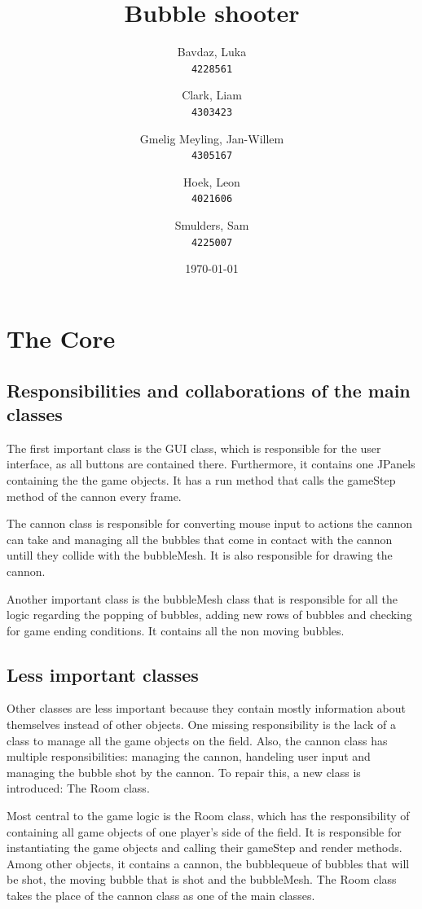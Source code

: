\documentclass[a4paper]{article}
\title{Bubble shooter}
\author{
    Bavdaz, Luka\\
    \texttt{4228561}
    \and
    Clark, Liam\\
    \texttt{4303423}
    \and
    Gmelig Meyling, Jan-Willem\\
    \texttt{4305167}
    \and
    Hoek, Leon\\
    \texttt{4021606}
    \and
    Smulders, Sam\\
    \texttt{4225007}
}
\date{\today}
\begin{document}
\maketitle


\section{The Core}
\subsection{Responsibilities and collaborations of the main classes}
The first important class is the GUI class, which is responsible for the user interface, as all buttons are contained there. Furthermore, it contains one JPanels containing the the game objects. It has a run method that calls the gameStep method of the cannon every frame.

The cannon class is responsible for converting mouse input to actions the cannon can take and managing all the bubbles that come in contact with the cannon untill they collide with the bubbleMesh. It is also responsible for drawing the cannon.

Another important class is the bubbleMesh class that is responsible for all the logic regarding the popping of bubbles, adding new rows of bubbles and checking for game ending conditions. It contains all the non moving bubbles.

\subsection{Less important classes}
Other classes are less important because they contain mostly information about themselves instead of other objects. One missing responsibility is the lack of a class to manage all the game objects on the field. Also, the  cannon class has multiple responsibilities: managing the cannon, handeling user input and managing the bubble shot by the cannon. To repair this, a new class is introduced: The Room class.

Most central to the game logic is the Room class, which has the responsibility of containing all game objects of one player's side of the field. It is responsible for instantiating the game objects and calling their gameStep and render methods. Among other objects, it contains a cannon, the bubblequeue of bubbles that will be shot, the moving bubble that is shot and the bubbleMesh. The Room class takes the place of the cannon class as one of the main classes.
\end{document}

